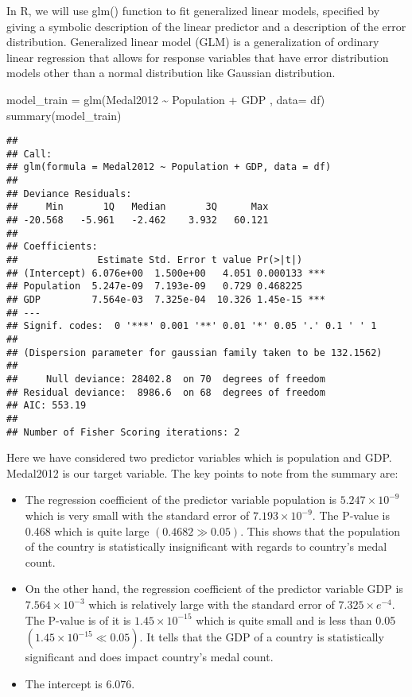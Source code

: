 \documentclass[
]{article}
\newenvironment{Shaded}{\begin{snugshade}}{\end{snugshade}}
\newcommand{\AttributeTok}[1]{\textcolor[rgb]{0.77,0.63,0.00}{#1}}
\newcommand{\FunctionTok}[1]{\textcolor[rgb]{0.00,0.00,0.00}{#1}}
\newcommand{\NormalTok}[1]{#1}
\newcommand{\OtherTok}[1]{\textcolor[rgb]{0.56,0.35,0.01}{#1}}
\newcommand{\SpecialCharTok}[1]{\textcolor[rgb]{0.00,0.00,0.00}{#1}}
\providecommand{\tightlist}{%
  \setlength{\itemsep}{0pt}\setlength{\parskip}{0pt}}
\begin{document}
In R, we will use glm() function to fit generalized linear models,
specified by giving a symbolic description of the linear predictor and a
description of the error distribution. Generalized linear model (GLM) is
a generalization of ordinary linear regression that allows for response
variables that have error distribution models other than a normal
distribution like Gaussian distribution.

\begin{Shaded}
\begin{Highlighting}[]
\NormalTok{model\_train }\OtherTok{=} \FunctionTok{glm}\NormalTok{(Medal2012 }\SpecialCharTok{\textasciitilde{}}\NormalTok{ Population }\SpecialCharTok{+}\NormalTok{ GDP , }\AttributeTok{data=}\NormalTok{ df)}
\FunctionTok{summary}\NormalTok{(model\_train)}
\end{Highlighting}
\end{Shaded}

\begin{verbatim}
## 
## Call:
## glm(formula = Medal2012 ~ Population + GDP, data = df)
## 
## Deviance Residuals: 
##     Min       1Q   Median       3Q      Max  
## -20.568   -5.961   -2.462    3.932   60.121  
## 
## Coefficients:
##              Estimate Std. Error t value Pr(>|t|)    
## (Intercept) 6.076e+00  1.500e+00   4.051 0.000133 ***
## Population  5.247e-09  7.193e-09   0.729 0.468225    
## GDP         7.564e-03  7.325e-04  10.326 1.45e-15 ***
## ---
## Signif. codes:  0 '***' 0.001 '**' 0.01 '*' 0.05 '.' 0.1 ' ' 1
## 
## (Dispersion parameter for gaussian family taken to be 132.1562)
## 
##     Null deviance: 28402.8  on 70  degrees of freedom
## Residual deviance:  8986.6  on 68  degrees of freedom
## AIC: 553.19
## 
## Number of Fisher Scoring iterations: 2
\end{verbatim}

Here we have considered two predictor variables which is population and
GDP. Medal2012 is our target variable. The key points to note from the
summary are:

\begin{itemize}
\tightlist
\item
  The regression coefficient of the predictor variable population is
  \(5.247 \times 10^{-9}\) which is very small with the standard error
  of \(7.193 \times 10^{-9}\). The P-value is 0.468 which is quite large
  \((0.4682 \gg 0.05)\). This shows that the population of the country
  is statistically insignificant with regards to country's medal count.
\item
  On the other hand, the regression coefficient of the predictor
  variable GDP is \(7.564 \times 10^{−3}\) which is relatively large
  with the standard error of \(7.325 \times e^{-4}\). The P-value is of
  it is \(1.45 \times 10^{-15}\) which is quite small and is less than
  0.05 \((1.45 \times 10^{-15} \ll 0.05)\). It tells that the GDP of a
  country is statistically significant and does impact country's medal
  count.
\item
  The intercept is \(6.076\).
\end{itemize}
\end{document}
